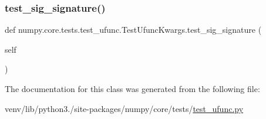 \subsubsection{\texorpdfstring{test\+\_\+sig\+\_\+signature()}{test\_sig\_signature()}}
{\footnotesize\ttfamily def numpy.\+core.\+tests.\+test\+\_\+ufunc.\+Test\+Ufunc\+Kwargs.\+test\+\_\+sig\+\_\+signature (\begin{DoxyParamCaption}\item[{}]{self }\end{DoxyParamCaption})}



The documentation for this class was generated from the following file\+:\begin{DoxyCompactItemize}
\item 
venv/lib/python3./site-\/packages/numpy/core/tests/\hyperlink{test__ufunc_8py}{test\+\_\+ufunc.\+py}\end{DoxyCompactItemize}
